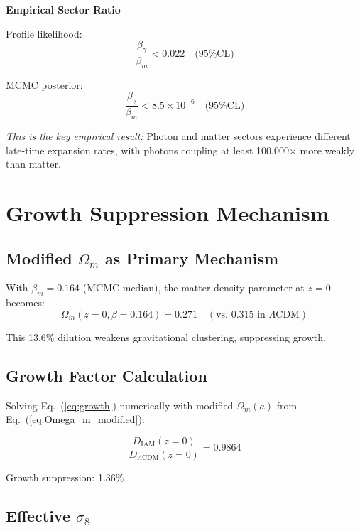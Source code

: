 \documentclass[twocolumn,superscriptaddress,prl,amsmath,amssymb]{revtex4-2}
\begin{document}
\textbf{Empirical Sector Ratio}

Profile likelihood:
\begin{equation}
\frac{\beta_\gamma}{\beta_m} < 0.022 \quad \text{(95\% CL)}
\end{equation}

MCMC posterior:
\begin{equation}
\frac{\beta_\gamma}{\beta_m} < 8.5 \times 10^{-6} \quad \text{(95\% CL)}
\label{eq:sector_ratio}
\end{equation}

\textit{This is the key empirical result:} Photon and matter sectors experience different late-time expansion rates, with photons coupling at least 100,000$\times$ more weakly than matter.

\section{Growth Suppression Mechanism}

\subsection{Modified $\Omega_m$ as Primary Mechanism}

With $\beta_m = 0.164$ (MCMC median), the matter density parameter at $z=0$ becomes:
\begin{equation}
\Omega_m(z=0, \beta=0.164) = 0.271 \quad (\text{vs. } 0.315 \text{ in } \Lambda\text{CDM})
\end{equation}

This 13.6\% dilution weakens gravitational clustering, suppressing growth.

\subsection{Growth Factor Calculation}

Solving Eq.~(\ref{eq:growth}) numerically with modified $\Omega_m(a)$ from Eq.~(\ref{eq:Omega_m_modified}):

\begin{equation}
\frac{D_{\text{IAM}}(z=0)}{D_{\Lambda\text{CDM}}(z=0)} = 0.9864
\end{equation}

Growth suppression: 1.36\%

\subsection{Effective $\sigma_8$}
\end{document}
